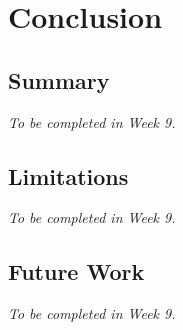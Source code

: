 
\chapter{Conclusion}\label{chap:conclusion}


\section{Summary}\label{sec:summary}
\textit{To be completed in Week 9.}

\section{Limitations}\label{sec:limitations}
\textit{To be completed in Week 9.}

\section{Future Work}\label{sec:future_work}
\textit{To be completed in Week 9.}
